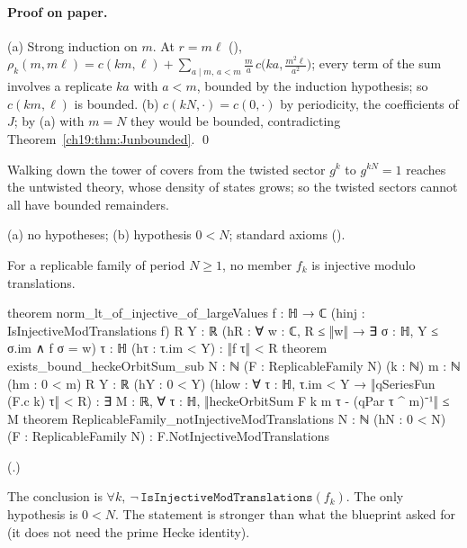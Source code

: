 \paragraph{Proof on paper.}  (a) Strong induction on $m$.  At $r=m\ell$ (),
$\rho_k(m,m\ell)=c(km,\ell)+\sum_{a\mid m,\,a<m}\frac ma\,c\bigl(ka,\frac{m^2\ell}{a^2}\bigr)$; every term of the sum involves a replicate $ka$ with
$a<m$, bounded by the induction hypothesis; so $c(km,\ell)$ is bounded.  (b) $c(kN,\cdot)=c(0,\cdot)$ by periodicity, the
coefficients of $J$; by (a) with $m=N$ they would be bounded, contradicting Theorem~\ref{ch19:thm:Junbounded}. \qed
\begin{physics}Walking down the tower of covers from the twisted sector $g^k$ to $g^{kN}=1$ reaches the untwisted theory,
whose density of states grows; so the twisted sectors cannot all have bounded remainders.\end{physics}
\begin{status}(a) no hypotheses; (b) hypothesis $0<N$; standard axioms ().\end{status}

\begin{theorem}[Nontriviality]\label{ch19:thm:nontrivial}
For a replicable family of period $N\ge1$, no member $f_k$ is injective modulo translations.
\end{theorem}
\begin{leancode}
theorem norm_lt_of_injective_of_largeValues {f : ℍ → ℂ} (hinj : IsInjectiveModTranslations f)
    {R Y : ℝ} (hR : ∀ w : ℂ, R ≤ ‖w‖ → ∃ σ : ℍ, Y ≤ σ.im ∧ f σ = w) {τ : ℍ} (hτ : τ.im < Y) :
    ‖f τ‖ < R
theorem exists_bound_heckeOrbitSum_sub {N : ℕ} (F : ReplicableFamily N) (k : ℕ) {m : ℕ}
    (hm : 0 < m) {R Y : ℝ} (hY : 0 < Y)
    (hlow : ∀ τ : ℍ, τ.im < Y → ‖qSeriesFun (F.c k) τ‖ < R) :
    ∃ M : ℝ, ∀ τ : ℍ, ‖heckeOrbitSum F k m τ - (qPar τ ^ m)⁻¹‖ ≤ M
theorem ReplicableFamily_notInjectiveModTranslations {N : ℕ} (hN : 0 < N)
    (F : ReplicableFamily N) : F.NotInjectiveModTranslations
\end{leancode}
(.)
\begin{dictionary}
The conclusion  is $\forall k,\ \neg\,\mathtt{IsInjectiveModTranslations}(f_k)$.  The
only hypothesis is $0<N$.  The statement is stronger than what the blueprint asked for (it does not need the prime Hecke
identity).
\end{dictionary}
